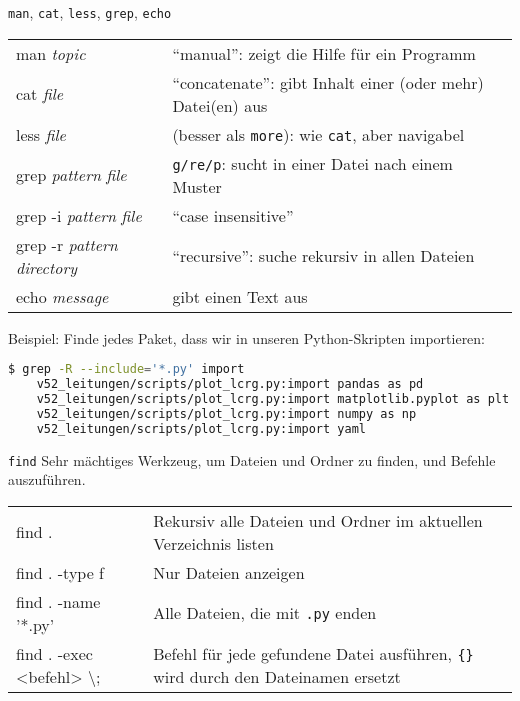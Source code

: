 \begin{frame}[fragile]{\texttt{man}, \texttt{cat}, \texttt{less}, \texttt{grep}, \texttt{echo}}
  \begin{tabu}{>{\ttfamily}l X[,L]}
    man \textit{topic}    & \enquote{manual}: zeigt die Hilfe für ein Programm \\
    cat \textit{file}                           & \enquote{concatenate}: gibt Inhalt einer (oder mehr) Datei(en) aus \\
    less \textit{file}                          & (besser als \texttt{more}): wie \texttt{cat}, aber navigabel \\
    grep \textit{pattern} \textit{file}         & \texttt{g/re/p}: sucht in einer Datei nach einem Muster \\
    grep -i \textit{pattern} \textit{file}      & \enquote{case insensitive} \\
    grep -r \textit{pattern} \textit{directory} & \enquote{recursive}: suche rekursiv in allen Dateien \\
    echo \textit{message}                       & gibt einen Text aus
  \end{tabu}

  Beispiel: Finde jedes Paket, dass wir in unseren Python-Skripten importieren:
  
  \begin{lstlisting}[language=bash]
    $ grep -R --include='*.py' import
    v52_leitungen/scripts/plot_lcrg.py:import pandas as pd
    v52_leitungen/scripts/plot_lcrg.py:import matplotlib.pyplot as plt
    v52_leitungen/scripts/plot_lcrg.py:import numpy as np
    v52_leitungen/scripts/plot_lcrg.py:import yaml
  \end{lstlisting}

\end{frame}

\begin{frame}[fragile]{\texttt{find}}
  Sehr mächtiges Werkzeug, um Dateien und Ordner zu finden, und Befehle auszuführen.

  \begin{tabu}{>{\ttfamily}l X[,L]}
    find . & Rekursiv alle Dateien und Ordner im aktuellen Verzeichnis listen \\
    find . -type f & Nur Dateien anzeigen \\
    find . -name '*.py' & Alle Dateien, die mit \texttt{.py} enden \\
    find . -exec <befehl> \textbackslash{}; & Befehl für jede gefundene Datei ausführen, \texttt{\{\}} wird durch den Dateinamen ersetzt \\
  \end{tabu}
\end{frame}

